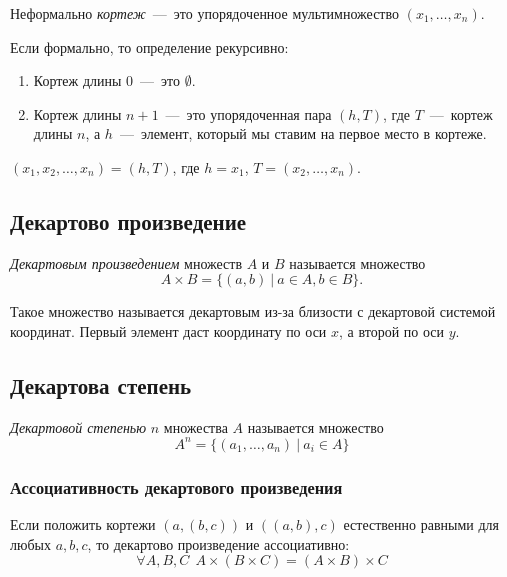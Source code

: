 \begin{definition}
	Неформально \textit{кортеж}~---~это упорядоченное мультимножество $(x_1, \ldots, x_n)$.
	
	Если формально, то определение рекурсивно:
	\begin{enumerate}
		\item Кортеж длины 0~---~это $\emptyset$.
		\item Кортеж длины $n + 1$~---~это упорядоченная пара $(h, T)$, где $T$~---~кортеж длины $n$, а $h$~---~элемент, который мы ставим на первое место в кортеже.
	\end{enumerate}
\end{definition}

\begin{example}
	$(x_1, x_2, \dots, x_n) = (h, T)$, где $h = x_1$, $T = (x_2, \dots, x_n)$.
\end{example}

\subsection{Декартово произведение}

\begin{definition}
	\textit{Декартовым произведением} множеств $A$ и $B$ называется множество
	$$
	A \times B = \{(a, b)\ |\ a \in A, b \in B\}.
	$$
\end{definition}

\begin{note}
	Такое множество называется декартовым из-за близости с декартовой системой координат. Первый элемент даст координату по оси $x$, а второй по оси $y$.
\end{note}

\subsection{Декартова степень}

\begin{definition}
	\textit{Декартовой степенью} $n$ множества $A$ называется множество
	$$
	A^n = \{(a_1, \dots, a_n)\ |\ a_i \in A\}
	$$
\end{definition}

\subsubsection*{Ассоциативность декартового произведения}

\begin{proposition}
	Если положить кортежи $(a, (b, c))$ и $((a, b), c)$ естественно равными для любых $a, b, c$, то декартово произведение ассоциативно:
	\[
		\forall A, B, C\ \ A \times (B \times C) = (A \times B) \times C
	\]
\end{proposition}

